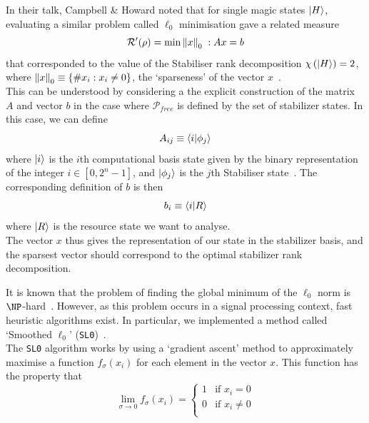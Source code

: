 \documentclass{standalone}
\begin{document}
In their talk, Campbell \& Howard noted that for single magic states $\ket{H}$, evaluating a similar problem called $\ell_{0}$ minimisation gave a related measure 
\begin{equation}
    \mathcal{R}'(\rho)=\min \norm{x}_{0}\; : Ax=b
\end{equation}
that corresponded to the value of the Stabiliser rank decomposition $\chi\left(\ket{H}\right)=2$, where $\norm{x}_{0}\equiv \{\# x_{i} : x_{i}\neq 0\}$, the `sparseness' of the vector $x$~\cite{Howard2016}.\\
This can be understood by considering a the explicit construction of the matrix $A$ and vector $b$ in the case where $\mathcal{P}_{free}$ is defined by the set of stabilizer states. In this case, we can define 
\begin{equation}\label{eq:Amat}
    A_{ij}\equiv\braket{i}{\phi_{j}}
\end{equation}
where $\ket{i}$ is the $i$th computational basis state given by the binary representation of the integer $i\in[0,2^{n}-1]$, and $\ket{\phi_{j}}$ is the $j$th Stabiliser state~\cite{Howard2016}. The corresponding definition of $b$ is then
\begin{equation}\label{eq:bvec}
    b_{i}\equiv \braket{i}{R}
\end{equation}
where $\ket{R}$ is the resource state we want to analyse.\\
The vector $x$ thus gives the representation of our state in the stabilizer basis, and the sparsest vector should correspond to the optimal stabilizer rank decomposition. 
\par
It is known that the problem of finding the global minimum of the $\ell_{0}$ norm is $\NP$-hard~\cite{ge2011note}. However, as this problem occurs in a signal processing context, fast heuristic algorithms exist. In particular, we implemented a method called `Smoothed $\ell_{0}$' (\texttt{SL0})~\cite{Mohimani2009}. \\
The \texttt{SL0} algorithm works by using a `gradient ascent' method to approximately maximise a function $f_{\sigma}(x_{i})$ for each element in the vector $x$. This function has the property that
\begin{equation}\label{eq:limf}
    \lim_{\sigma\rightarrow 0}f_{\sigma}(x_{i}) = \begin{cases} 1 & \text{if } x_{i}=0\\
                                                                0 & \text{if } x_{i}\neq 0\\
                                                  \end{cases}
\end{equation}
\end{document}
